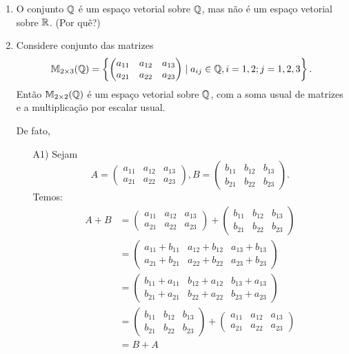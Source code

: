 \begin{exemplo}
\begin{enumerate}[label={\arabic*})]
		\item O conjunto $\mathbb{Q}$ \'e um espa\c{c}o vetorial sobre $\mathbb{Q}$, mas n\~ao \'e um espa\c{c}o vetorial sobre $\mathbb{R}$. (Por qu\^e?)

		\item Considere conjunto das matrizes
		      \[
			      \mathbb{M}_{2 \times 3}(\mathbb{Q}) = \left\{\begin{pmatrix}a_{11} & a_{12} & a_{13}\\a_{21} & a_{22} & a_{23}\end{pmatrix} \mid a_{ij} \in \mathbb{Q}, i = 1, 2; j = 1, 2, 3\right\}.
		      \]
		      Então $\mathbb{M}_{2\times 2}(\mathbb{Q})$ é um espa\c{c}o vetorial sobre $\mathbb{Q}$, com a soma usual de matrizes e a multiplica\c{c}\~ao por escalar usual.
		      \begin{solucao}
			      De fato,
			      \begin{itemize}
				      \item[A1)] Sejam
					      \[
						      A = \begin{pmatrix} a_{11} & a_{12} & a_{13}\\a_{21} & a_{22} & a_{23}\end{pmatrix},
						      B = \begin{pmatrix} b_{11} & b_{12} & b_{13}\\b_{21} & b_{22} & b_{23}\end{pmatrix}.
					      \]
					      Temos:
					      \begin{align*}
						      A + B & = \begin{pmatrix} a_{11} & a_{12} & a_{13}\\a_{21} & a_{22} & a_{23}\end{pmatrix} + \begin{pmatrix} b_{11} & b_{12} & b_{13}\\b_{21} & b_{22} & b_{23}\end{pmatrix}
						      \\ &= \begin{pmatrix} a_{11} + b_{11} & a_{12} + b_{12} & a_{13} + b_{13}\\a_{21} + b_{21} & a_{22} + b_{22} & a_{23} + b_{23}\end{pmatrix}
						      \\ &= \begin{pmatrix} b_{11} + a_{11} & b_{12} + a_{12} & b_{13} + a_{13}\\b_{21} + a_{21} & b_{22} + a_{22} & b_{23} + a_{23}\end{pmatrix}
						      \\ &= \begin{pmatrix} b_{11} & b_{12} & b_{13}\\b_{21} & b_{22} & b_{23}\end{pmatrix} + \begin{pmatrix} a_{11} & a_{12} & a_{13}\\a_{21} & a_{22} & a_{23}\end{pmatrix}
						      \\ &= B + A
					      \end{align*}


\end{itemize}
\end{solucao}
\end{enumerate}
\end{exemplo}
